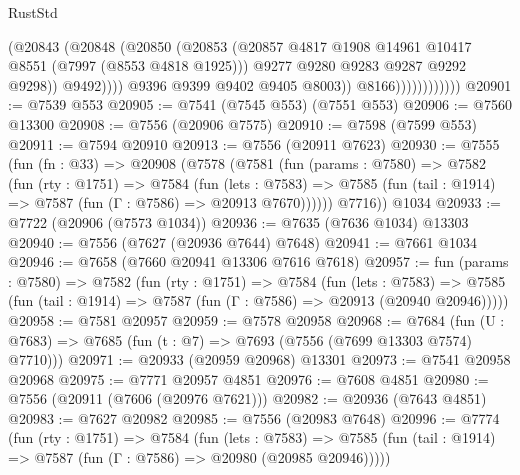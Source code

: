 \begin{lexlean}{RustStd}
\begin{coremodule}
                                    (@20843
                                      (@20848
                                        (@20850
                                          (@20853
                                            (@20857
                                              @4817
                                              @1908
                                              @14961
                                              @10417
                                              @8551
                                              (@7997 (@8553 @4818 @1925)))
                                            @9277
                                            @9280
                                            @9283
                                            @9287
                                            @9292
                                            @9298))
                                        @9492))))
                                @9396
                                @9399
                                @9402
                                @9405
                                @8003))
                            @8166))))))))))))
@20901 := @7539 @553
@20905 := @7541 (@7545 @553) (@7551 @553)
@20906 := @7560 @13300
@20908 := @7556 (@20906 @7575)
@20910 := @7598 (@7599 @553)
@20911 := @7594 @20910
@20913 := @7556 (@20911 @7623)
@20930 := @7555
    (fun (fn : @33) =>
    @20908
      (@7578
        (@7581
          (fun (params : @7580) =>
          @7582
            (fun (rty : @1751) =>
            @7584
              (fun (lets : @7583) =>
              @7585 (fun (tail : @1914) => @7587 (fun (Γ : @7586) => @20913 @7670))))))
        @7716))
    @1034
@20933 := @7722 (@20906 (@7573 @1034))
@20936 := @7635 (@7636 @1034) @13303
@20940 := @7556 (@7627 (@20936 @7644) @7648)
@20941 := @7661 @1034
@20946 := @7658 (@7660 @20941 @13306 @7616 @7618)
@20957 := fun (params : @7580) =>
  @7582
    (fun (rty : @1751) =>
    @7584
      (fun (lets : @7583) =>
      @7585 (fun (tail : @1914) => @7587 (fun (Γ : @7586) => @20913 (@20940 @20946)))))
@20958 := @7581 @20957
@20959 := @7578 @20958
@20968 := @7684
    (fun (U : @7683) => @7685 (fun (t : @7) => @7693 (@7556 (@7699 @13303 @7574) @7710)))
@20971 := @20933 (@20959 @20968) @13301
@20973 := @7541 @20958 @20968
@20975 := @7771 @20957 @4851
@20976 := @7608 @4851
@20980 := @7556 (@20911 (@7606 (@20976 @7621)))
@20982 := @20936 (@7643 @4851)
@20983 := @7627 @20982
@20985 := @7556 (@20983 @7648)
@20996 := @7774
    (fun (rty : @1751) =>
    @7584
      (fun (lets : @7583) =>
      @7585 (fun (tail : @1914) => @7587 (fun (Γ : @7586) => @20980 (@20985 @20946)))))

\end{coremodule}
\end{lexlean}
